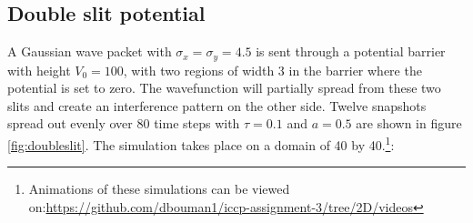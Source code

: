 \subsection*{Double slit potential}
A Gaussian wave packet with $\sigma_x = \sigma_y = 4.5$ is sent through a potential barrier with height $V_0 = 100$, with two regions of width 3 in the barrier where the potential is set to zero. The wavefunction will partially spread from these two slits and create an interference pattern on the other side. Twelve snapshots spread out evenly over 80 time steps with $\tau = 0.1$ and $a=0.5$ are shown in figure \ref{fig:doubleslit}. The simulation takes place on a domain of 40 by 40.\footnote{Animations of these simulations can be viewed on:\url{https://github.com/dbouman1/iccp-assignment-3/tree/2D/videos}}:


%
\def\arraystretch{0.6}%
\setlength\tabcolsep{0.5mm}
